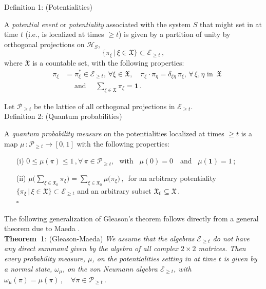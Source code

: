 \documentclass[12pt]{article}
\begin{document}
{Definition 1}: (Potentialities)

A \textit{potential event} or \textit{potentiality} associated with the system $S$ that might set in at time $t$ (i.e., is localized
at times $\geq t$) is given by a partition of unity by orthogonal projections on $\mathcal{H}_S$,
$$\big\{ \pi_{\xi}\, \vert \,\xi \in \mathfrak{X} \big\} \subset \mathcal{E}_{\geq t}\,,$$
where $\mathfrak{X}$ is a countable set, with the following properties:
\begin{align}\label{potentialty}
\quad \pi_{\xi} &= \pi_{\xi}^{*} \in \mathcal{E}_{\geq t},\, \forall \xi \in \mathfrak{X}, \quad
\pi_{\xi}\cdot\pi_{\eta} = \delta_{\xi \eta}\, \pi_{\xi}, \,\forall\, \xi, \eta \text{ in }\, \mathfrak{X} \nonumber\\
& \quad \text{ and } \quad \sum_{\xi \in \mathfrak{X}} \pi_{\xi} = \mathbf{1}\,.
\end{align}

Let $\mathcal{P}_{\geq t}$ be the lattice of all orthogonal projections in $\mathcal{E}_{\geq t}$. \\

{Definition 2}: (Quantum probabilities)

A \textit{quantum probability measure} on the potentialities localized at times  $\geq t$ is a map
$\mu\,: \mathcal{P}_{\geq t} \rightarrow [0, 1]$ with the following properties:
\begin{enumerate}
\item[(i)]{ $0 \leq \mu(\pi) \leq 1\,, \forall\, \pi \in \mathcal{P}_{\geq t},$ \,\,with \,\,\,$\mu(0)=0\,$ \, and \, $\mu(\mathbf{1})=1\,$;}
\item[(ii)]{ $\mu\big(\sum_{\xi \in \mathfrak{X}_0} \pi_{\xi}\big) =
\sum_{\xi \in \mathfrak{X}_0} \mu\big(\pi_{\xi}\big)\,,$
\,for an arbitrary potentiality $\big\{ \pi_{\xi}\, \vert\, \xi \in \mathfrak{X} \big\} \subset \mathcal{E}_{\geq t}$ and
an arbitrary subset $\mathfrak{X}_0 \subseteq \mathfrak{X}$\,.
\\
$\square$}
\end{enumerate}

The following generalization of {Gleason}'s theorem \cite{Gleason} follows directly from a general theorem due to
{Maeda} \cite{Maeda}.\\

{\bf{Theorem~1}}: (Gleason-Maeda) \textit{We assume that the algebras $\mathcal{E}_{\geq t}$ do not have any direct
summand given by the algebra of all complex $2\times 2$ matrices. Then every probability measure, $\mu$, on the
potentialities setting in at time $t$ is given by a normal state, $\omega_{\mu}$, on the von Neumann algebra
$\mathcal{E}_{\geq t}$, with
$ \omega_{\mu}(\pi) = \mu(\pi)\,,\quad  \forall \pi \in \mathcal{P}_{\geq t}\,.$
}\\
\end{document}
